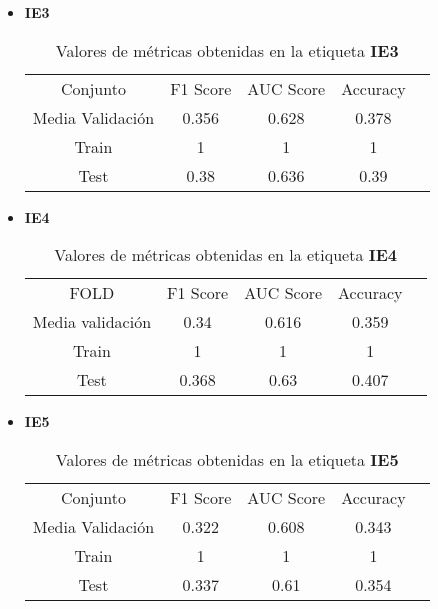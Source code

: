 \begin{itemize}
	\item  \textbf{IE3}
	      \begin{table}[H]
		      \centering
		      \begin{tabular}{|c|c|c|c|c}
			      \cline{1-4}
			      Conjunto         & F1 Score & AUC Score & Accuracy \\ \cline{1-4}
			      Media Validación & 0.356    & 0.628     & 0.378    \\ \cline{1-4}
			      Train            & 1        & 1         & 1        \\ \cline{1-4}
			      Test             & 0.38     & 0.636     & 0.39     \\ \cline{1-4}
		      \end{tabular}
		      \caption{Valores de métricas obtenidas en la etiqueta \textbf{IE3}}
	      \end{table}
	\item  \textbf{IE4}
	      \begin{table}[H]
		      \centering
		      \begin{tabular}{|c|c|c|c|c}
			      \cline{1-4}
			      FOLD             & F1 Score & AUC Score & Accuracy \\ \cline{1-4}
			      Media validación & 0.34     & 0.616     & 0.359    \\ \cline{1-4}
			      Train            & 1        & 1         & 1        \\ \cline{1-4}
			      Test             & 0.368    & 0.63      & 0.407    \\ \cline{1-4}
		      \end{tabular}
		      \caption{Valores de métricas obtenidas en la etiqueta \textbf{IE4}}
	      \end{table}
	\item  \textbf{IE5}
	      \begin{table}[H]
		      \centering
		      \begin{tabular}{|c|c|c|c|c}
			      \cline{1-4}
			      Conjunto         & F1 Score & AUC Score & Accuracy \\ \cline{1-4}
			      Media Validación & 0.322    & 0.608     & 0.343    \\ \cline{1-4}
			      Train            & 1        & 1         & 1        \\ \cline{1-4}
			      Test             & 0.337    & 0.61      & 0.354    \\ \cline{1-4}
		      \end{tabular}
		      \caption{Valores de métricas obtenidas en la etiqueta \textbf{IE5}}

\end{table}
\end{itemize}

